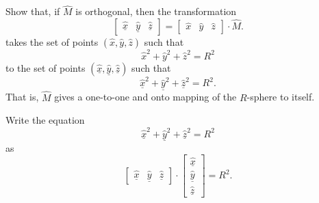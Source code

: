 \documentclass{ximera}
\begin{document}
\begin{problem}
  Show that, if $\hat{M}$ is orthogonal, then the transformation
  \[
  \begin{bmatrix}
    \underline{\hat{x}} & \underline{\hat{y}} & \underline{\hat{z}}
  \end{bmatrix}
  =
  \begin{bmatrix}
    \hat{x} & \hat{y} & \hat{z}
  \end{bmatrix}
  \cdot \hat{M}.
  \]
  takes the set of points $\left(\hat{x},\hat{y},\hat{z}\right)$ such
  that
\[
\hat{x}^2 + \hat{y}^2 + \hat{z}^2 = R^2
\]
to the set of points
$\left(\underline{\hat{x}},\underline{\hat{y}},\underline{\hat{z}}\right)$
such that
\[
\underline{\hat{x}}^2 + \underline{\hat{y}}^{2} + \underline{\hat{z}}^{2}=R^2.
\]
That is, $\hat{M}$ gives a one-to-one and onto mapping of the $R$-sphere to
itself.
\begin{hint}
  Write the equation
  \[
  \underline{\hat{x}}^2 + \underline{\hat{y}}^{2} + \underline{\hat{z}}^{2}=R^2
  \]
  as
  \[
  \begin{bmatrix}
    \underline{\hat{x}} & \underline{\hat{y}} & \underline{\hat{z}}%
  \end{bmatrix}  
  \cdot
  \begin{bmatrix}
    \underline{\hat{x}}\\
    \underline{\hat{y}}\\
    \underline{\hat{z}}
  \end{bmatrix}  =R^2.
  \]
\end{hint}


\end{problem}
\end{document}
